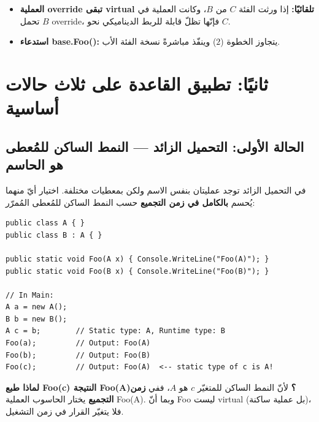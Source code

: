 \documentclass[14pt]{extarticle}
\begin{document}
\begin{boxAttention}
\begin{itemize}
    \item \textbf{العملية \textenglish{override} تبقى \textenglish{virtual} تلقائيًا:} إذا ورثت الفئة $C$ من $B$، وكانت العملية في $B$ تحمل \textenglish{override}، فإنّها تظلّ قابلة للربط الديناميكي نحو $C$.
    \item \textbf{استدعاء \textenglish{base.Foo()}:} يتجاوز الخطوة ($2$) وينفّذ مباشرةً نسخة الفئة الأب.
\end{itemize}
\end{boxAttention}

\clearpage
\section*{ثانيًا: تطبيق القاعدة على ثلاث حالات أساسية}

\filbreak
\subsection*{الحالة الأولى: التحميل الزائد — النمط الساكن للمُعطى هو الحاسم}
في التحميل الزائد توجد عمليتان بنفس الاسم ولكن بمعطيات مختلفة. اختيار أيّ منهما يُحسم \textbf{بالكامل في زمن التجميع} حسب النمط الساكن للمُعطى المُمرّر:

\begin{boxCode}
\begin{english}
\begin{verbatim}
public class A { }
public class B : A { }

public static void Foo(A x) { Console.WriteLine("Foo(A)"); }
public static void Foo(B x) { Console.WriteLine("Foo(B)"); }

// In Main:
A a = new A();
B b = new B();
A c = b;        // Static type: A, Runtime type: B
Foo(a);         // Output: Foo(A)
Foo(b);         // Output: Foo(B)
Foo(c);         // Output: Foo(A)  <-- static type of c is A!
\end{verbatim}
\end{english}
\end{boxCode}

\textbf{لماذا طبع \textenglish{Foo(c)} النتيجة \textenglish{Foo(A)}؟}
لأنّ النمط الساكن للمتغيّر $c$ هو $A$، ففي \textbf{زمن التجميع} يختار الحاسوب العملية \textenglish{Foo(A)}. وبما أنّ \textenglish{Foo} ليست \textenglish{virtual} (بل عملية ساكنة)، فلا يتغيّر القرار في زمن التشغيل.
\end{document}
